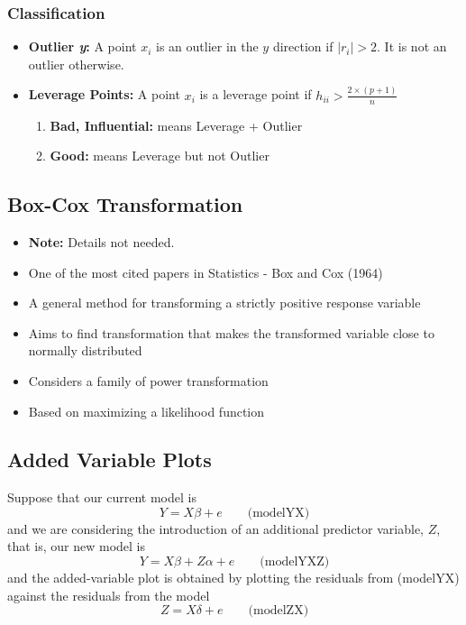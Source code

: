 \documentclass[10pt]{article}
\begin{document}
\subsubsection{Classification}
\begin{itemize}
    \item \textbf{Outlier \textit{y}:} A point $x_i$ is an outlier in the $y$ direction if $|r_i| > 2$. It is not an outlier otherwise.
    \item \textbf{Leverage Points:} A point $x_i$ is a leverage point if $h_{ii} > \frac{2\times (p+1)}{n}$
        \begin{enumerate}
            \item \textbf{Bad, Influential:} means Leverage + Outlier
            \item \textbf{Good:} means Leverage but not Outlier
        \end{enumerate}
\end{itemize}


\subsection{Box-Cox Transformation} 
\begin{itemize}
    \item \textbf{Note:} Details not needed.
    \item One of the most cited papers in Statistics - Box and Cox (1964)
    \item A general method for transforming a strictly positive response variable
    \item Aims to find transformation that makes the transformed variable close to normally distributed
    \item Considers a family of power transformation
    \item Based on maximizing a likelihood function
\end{itemize}

\subsection{Added Variable Plots}
Suppose that our current model is 
\begin{equation*}
    Y = X\beta + e \quad \quad \text{(modelYX)}
\end{equation*}
and we are considering the introduction of an additional predictor variable, $Z$, that is, our new model is 
\begin{equation*}
    Y = X\beta + Z \alpha + e \quad \quad \text{(modelYXZ)}
\end{equation*}
and the added-variable plot is obtained by plotting the residuals from (modelYX) against the residuals from the model
\begin{equation*}
    Z = X\delta + e\quad \quad \text{(modelZX)}
\end{equation*}
\end{document}
